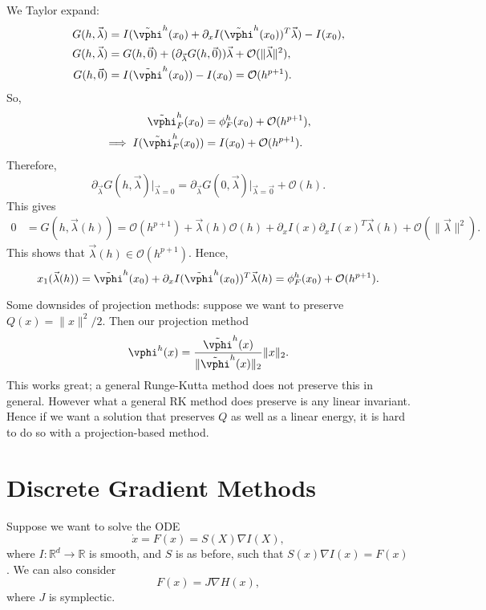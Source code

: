 \documentclass[12pt]{article}
\begin{document}
\begin{proofbox}
	We Taylor expand:
	\begin{align*}
		G(h, \vec \lambda) &= I(\tilde \vphi^{h}(x_0) + \partial_x I(\tilde \vphi^{h}(x_0))^{T} \vec \lambda) - I(x_0), \\
		G(h, \vec \lambda) &= G(h, \vec 0) + (\partial_{\vec \lambda} G(h, \vec 0)) \vec \lambda + \mathcal{O}(\|\vec \lambda\|^2), \\
		G(h, \vec 0) &= I(\tilde \vphi^{h}(x_0)) - I(x_0) = \mathcal{O}(h^{p+1}).
	\end{align*}
	So,
	\begin{align*}
		\tilde \vphi_{F}^{h}(x_0) &= \phi_F^{h}(x_0) + \mathcal{O}(h^{p+1}), \\
		\implies I(\tilde \vphi_F^{h}(x_0)) &= I(x_0) + \mathcal{O}(h^{p+1}).
	\end{align*}
	Therefore,
	\[
	\partial_{\vec \lambda}G(h, \vec \lambda)\biggr|_{\vec \lambda = 0} = \partial_{\vec \lambda} G(0, \vec \lambda)\biggr|_{\vec \lambda = \vec 0} + \mathcal{O}(h).
	\]
	This gives
	\begin{align*}
		0 &= G(h, \vec \lambda(h)) = \mathcal{O}(h^{p+1}) + \vec \lambda(h) \mathcal{O}(h) + \partial_{x} I(x) \partial_x I(x)^{T} \vec \lambda(h) + \mathcal{O}(\|\vec \lambda\|^2).
	\end{align*}
	This shows that $\vec \lambda(h) \in \mathcal{O}(h^{p+1})$. Hence,
	\[
	x_1(\vec \lambda(h)) = \tilde \vphi^{h}(x_0) + \partial_x I(\tilde \vphi^{h}(x_0))^{T} \vec \lambda(h) = \phi_F^{h}(x_0) + \mathcal{O}(h^{p+1}).
	\]
\end{proofbox}

Some downsides of projection methods: suppose we want to preserve $Q(x) = \|x\|^2/2$. Then our projection method
\[
\vphi^{h}(x) = \frac{\tilde \vphi^{h}(x)}{\|\tilde \vphi^{h}(x)\|_2} \|x\|_2.
\]
This works great; a general Runge-Kutta method does not preserve this in general. However what a general RK method does preserve is any linear invariant. Hence if we want a solution that preserves $Q$ as well as a linear energy, it is hard to do so with a projection-based method.

\newpage

\section{Discrete Gradient Methods}%
\label{sec:dgm}

Suppose we want to solve the ODE
\[
\dot x = F(x) = S(X) \nabla I(X),
\]
where $I : \mathbb{R}^{d} \to \mathbb{R}$ is smooth, and $S$ is as before, such that $S(x) \nabla I(x) = F(x)$. We can also consider
\[
F(x) = J \nabla H(x),
\]
where $J$ is symplectic.
\end{document}
